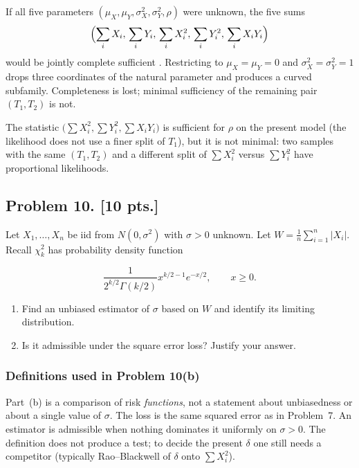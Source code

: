 \documentclass[11pt,a4paper]{article}
\begin{document}
\begin{remark}
\label{rem:p9-five-param}
If all five parameters \( (\mu_X,\mu_Y,\sigma_X^{2},\sigma_Y^{2},\rho) \) were unknown, the five sums
\[
\Bigl(\sum_{i}X_i,\,\sum_{i}Y_i,\,\sum_{i}X_i^{2},\,\sum_{i}Y_i^{2},\,\sum_{i}X_i Y_i\Bigr)
\]
would be jointly complete sufficient \citep[Exercise~7.5.8]{hogg2019}. Restricting to \( \mu_X=\mu_Y=0 \) and \( \sigma_X^{2}=\sigma_Y^{2}=1 \) drops three coordinates of the natural parameter and produces a curved subfamily. Completeness is lost; minimal sufficiency of the remaining pair \( (T_1,T_2) \) is not.

The statistic \( \bigl(\sum X_i^{2},\sum Y_i^{2},\sum X_i Y_i\bigr) \) is sufficient for \( \rho \) on the present model (the likelihood does not use a finer split of \( T_1 \)), but it is not minimal: two samples with the same \( (T_1,T_2) \) and a different split of \( \sum X_i^{2} \) versus \( \sum Y_i^{2} \) have proportional likelihoods.
\end{remark}

\subsection{Problem 10. [10 pts.]}
Let \( X_1, \dots, X_n \) be iid from \( N(0, \sigma^2) \) with \( \sigma > 0 \) unknown. Let \( W = \frac{1}{n} \sum_{i=1}^n |X_i| \). Recall \( \chi^2_k \) has probability density function

\[
\frac{1}{2^{k/2} \Gamma(k/2)} x^{k/2 - 1} e^{-x/2}, \qquad x \ge 0.
\]

\begin{enumerate}[label=(\alph*)]
    \item Find an unbiased estimator of \( \sigma \) based on \( W \) and identify its limiting distribution.
    \item Is it admissible under the square error loss? Justify your answer.
\end{enumerate}

\setcounter{section}{10}

\subsubsection{Definitions used in Problem 10(b)}

Part~(b) is a comparison of risk \emph{functions}, not a statement about unbiasedness or about a single value of \( \sigma \). The loss is the same squared error as in Problem~7. An estimator is admissible when nothing dominates it uniformly on \( \sigma>0 \). The definition does not produce a test; to decide the present \( \delta \) one still needs a competitor (typically Rao--Blackwell of \( \delta \) onto \( \sum X_i^{2} \)).
\end{document}
